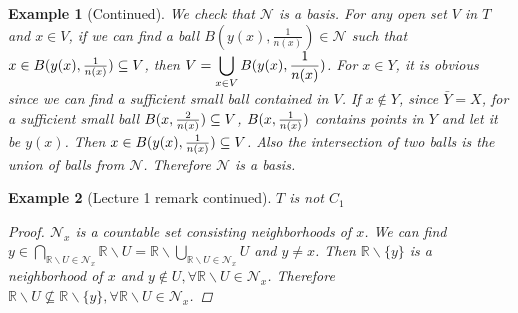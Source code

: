 \documentclass{article}
\newtheorem{example}{Example}[section] %
\begin{document}
\begin{example}[Continued]%
We check that $\mathcal{N}$ is a basis. For any open set $V$ in $T$ and $x\in V$, if we can find a ball $B(y(x),\frac{1}{n(x)})\in \mathcal{N}$ such that $x\in B(y(x),{1\over n(x)})\subseteq V$, then $V=\displaystyle\bigcup_{x\in V} B(y(x),{1\over n(x)})$. For $x\in Y$, it is obvious since we can find a sufficient small ball contained in $V$. If $x\not\in Y$, since $\bar{Y}=X$, for a sufficient small ball $B(x,{2\over n(x)})\subseteq V$, $B(x,{1\over n(x)})$ contains points in $Y$ and let it be $y(x)$. Then $x\in B(y(x),{1\over n(x)}) \subseteq V$. Also the intersection of two balls is the union of balls from $\mathcal{N}$. Therefore $\mathcal{N}$ is a basis.
\end{example}
\begin{example}[Lecture 1 remark  continued]
$T$ is not $C_1$
\begin{proof}
$\mathcal{N}_x$ is a countable set consisting neighborhoods of $x$. We can find $\displaystyle y \in \bigcap_{\mathbb{R}\backslash U\in \mathcal{N}_x}\mathbb{R}\backslash U = \mathbb{R}\backslash \bigcup_{\mathbb{R}\backslash U\in \mathcal{N}_x} U$ and $y\neq x$. Then $\mathbb{R}\backslash \{y\}$ is a neighborhood of $x$ and $y\not\in U,\forall\mathbb{R}\backslash U\in \mathcal{N}_x$. Therefore $\mathbb{R}\backslash U\not\subseteq\mathbb{R}\backslash \{y\},\forall \mathbb{R}\backslash U\in \mathcal{N}_x$.
\end{proof}
\end{example}
\end{document}
